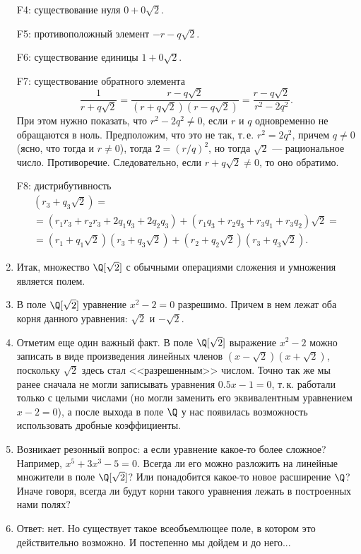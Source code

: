 \begin{enumerate}
F4: существование нуля $0+0\sqrt 2$.

F5: противоположный элемент $-r-q\sqrt 2$.

F6: существование единицы $1+0\sqrt 2$.

F7: существование обратного элемента
$$
\frac{1}{r+q\sqrt 2} = \frac{r-q\sqrt 2}{(r+q\sqrt 2)(r-q\sqrt 2)} = \frac{r-q\sqrt 2}{r^2-2q^2}.
$$
При этом нужно показать, что $r^2-2q^2\ne 0$, если $r$ и $q$ одновременно не обращаются в ноль. Предположим, что это не так, т.\,е. $r^2=2q^2$, причем $q\ne 0$ (ясно, что тогда и $r\ne 0$), тогда $2=(r/q)^2$, но тогда $\sqrt 2$ --- рациональное число. Противоречие. Следовательно, если $r+q\sqrt 2\ne 0$, то оно обратимо.

F8: дистрибутивность
\begin{multline*}
[(r_1+q_1\sqrt 2) + (r_2+q_2\sqrt 2)](r_3+q_3\sqrt 2) = \\
= (r_1r_3+r_2r_3+2q_1q_3+2q_2q_3) + (r_1q_3+r_2q_3+r_3q_1+r_3q_2)\sqrt 2 = \\
= (r_1+q_1\sqrt 2)(r_3+q_3\sqrt 2) + (r_2+q_2\sqrt 2)(r_3+q_3\sqrt 2).
\end{multline*}

\item Итак, множество $\Q[\sqrt 2]$ с обычными операциями сложения и умножения является полем.
\item В поле $\Q[\sqrt 2]$ уравнение $x^2-2=0$ разрешимо. Причем в нем лежат оба корня данного уравнения: $\sqrt 2$ и $-\sqrt 2$.
\item Отметим еще один важный факт. В поле $\Q[\sqrt 2]$ выражение $x^2-2$ можно записать в виде произведения линейных членов $(x-\sqrt 2)(x+\sqrt 2)$, поскольку $\sqrt 2$ здесь стал <<разрешенным>> числом. Точно так же мы ранее сначала не могли записывать уравнения $0.5x-1=0$, т.\,к. работали только с целыми числами (но могли заменить его эквивалентным уравнением $x-2=0$), а после выхода в поле $\Q$ у нас появилась возможность использовать дробные коэффициенты.
\item Возникает резонный вопрос: а если уравнение какое-то более сложное? Например, $x^5+3x^3-5=0$. Всегда ли его можно разложить на линейные множители в поле $\Q[\sqrt 2]$? Или понадобится какое-то новое расширение $\Q$?
Иначе говоря, всегда ли будут корни такого уравнения лежать в построенных нами полях?
\item Ответ: нет. Но существует такое всеобъемлющее поле, в котором это действительно возможно. И постепенно мы дойдем и до него...
\end{enumerate}






